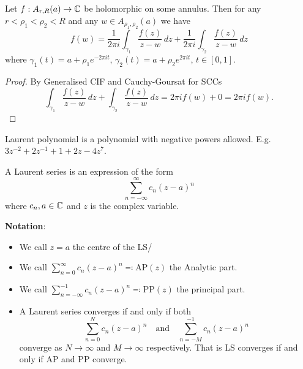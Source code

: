 \documentclass[10pt, a4paper]{article}
\begin{document}
\begin{proposition}
    Let $f : A_{r, R}(a) \to \mathbb{C}$ be holomorphic on some annulus.
    Then for any $r < \rho_1 < \rho_2 < R$ and any $w \in A_{\rho_1, \rho_2}(a)$ we have
    \[
    f(w) = \frac{1}{2\pi i}\int_{\gamma_1}\frac{f(z)}{z - w}\,dz + \frac{1}{2\pi i}\int_{\gamma_2}\frac{f(z)}{z - w}\,dz
    \]
    where $\gamma_1(t) = a + \rho_1e ^ {-2\pi it}$,
    $\gamma_2(t) = a + \rho_2e ^ {2\pi it}$,
    $t \in [0, 1]$.

    \begin{proof}
        By Generalised CIF and Cauchy-Goursat for SCCs
        \[
        \int_{\gamma_1}\frac{f(z)}{z - w}\,dz + \int_{\gamma_2}\frac{f(z)}{z - w}\,dz = 2\pi i f(w) + 0 = 2\pi if(w).
        \]
    \end{proof}
\end{proposition}

Laurent polynomial is a polynomial with negative powers allowed.
E.g. $3z ^ {-2} + 2z ^ {-1} + 1 + 2z - 4z ^ 7$.

\begin{definition}
    A Laurent series is an expression of the form
    \[
    \sum_{n = -\infty}^{\infty}c_n(z - a) ^ n
    \]
    where $c_n, a \in \mathbb{C}$ and $z$ is the complex variable.
\end{definition}

\textbf{Notation}:
\begin{itemize}
    \item We call $z = a$ the centre of the LS/

    \item We call $\sum_{n = 0}^{\infty}c_n(z - a) ^ n \eqqcolon \mathrm{AP}(z)$ the Analytic part.

    \item We call $\sum_{n = -\infty}^{-1}c_n(z - a) ^ n \eqqcolon \mathrm{PP}(z)$ the principal part.

    \item A Laurent series converges if and only if both
    \[
    \sum_{n = 0}^{N}c_n(z - a) ^ n\quad\text{and}\quad\sum_{n = -M}^{-1}c_n(z - a) ^ n
    \]
    converge as $N \to \infty$ and $M \to \infty$ respectively.
    That is LS converges if and only if $\mathrm{AP}$ and $\mathrm{PP}$ converge.
\end{itemize}
\end{document}
